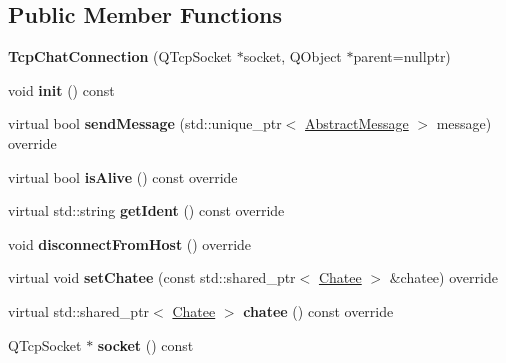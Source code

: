 \subsection*{Public Member Functions}
\begin{DoxyCompactItemize}
\item 
\hypertarget{classSimpleChat_1_1TcpChatConnection_a98eeb678c3851ecd89d9eaa42f2d4ed7}{{\bfseries Tcp\-Chat\-Connection} (Q\-Tcp\-Socket $\ast$socket, Q\-Object $\ast$parent=nullptr)}\label{classSimpleChat_1_1TcpChatConnection_a98eeb678c3851ecd89d9eaa42f2d4ed7}

\item 
\hypertarget{classSimpleChat_1_1TcpChatConnection_a4b67e948f1f6dbb1fedfc5c8f4995fac}{void {\bfseries init} () const }\label{classSimpleChat_1_1TcpChatConnection_a4b67e948f1f6dbb1fedfc5c8f4995fac}

\item 
\hypertarget{classSimpleChat_1_1TcpChatConnection_a70cf88d84909c6f541b5cafd23537f9b}{virtual bool {\bfseries send\-Message} (std\-::unique\-\_\-ptr$<$ \hyperlink{classSimpleChat_1_1AbstractMessage}{Abstract\-Message} $>$ message) override}\label{classSimpleChat_1_1TcpChatConnection_a70cf88d84909c6f541b5cafd23537f9b}

\item 
\hypertarget{classSimpleChat_1_1TcpChatConnection_a2765620a13f5fb7df8001829b01f1eb4}{virtual bool {\bfseries is\-Alive} () const override}\label{classSimpleChat_1_1TcpChatConnection_a2765620a13f5fb7df8001829b01f1eb4}

\item 
\hypertarget{classSimpleChat_1_1TcpChatConnection_a39c8ffddd847c0cf0942349e88143ff1}{virtual std\-::string {\bfseries get\-Ident} () const override}\label{classSimpleChat_1_1TcpChatConnection_a39c8ffddd847c0cf0942349e88143ff1}

\item 
\hypertarget{classSimpleChat_1_1TcpChatConnection_adfa72a80825262c93545627615dc62fd}{void {\bfseries disconnect\-From\-Host} () override}\label{classSimpleChat_1_1TcpChatConnection_adfa72a80825262c93545627615dc62fd}

\item 
\hypertarget{classSimpleChat_1_1TcpChatConnection_ab39fff987021e4d35f5ca3646e77f000}{virtual void {\bfseries set\-Chatee} (const std\-::shared\-\_\-ptr$<$ \hyperlink{classSimpleChat_1_1Chatee}{Chatee} $>$ \&chatee) override}\label{classSimpleChat_1_1TcpChatConnection_ab39fff987021e4d35f5ca3646e77f000}

\item 
\hypertarget{classSimpleChat_1_1TcpChatConnection_ae649c6797a93204f9383224b4c3d3160}{virtual std\-::shared\-\_\-ptr$<$ \hyperlink{classSimpleChat_1_1Chatee}{Chatee} $>$ {\bfseries chatee} () const override}\label{classSimpleChat_1_1TcpChatConnection_ae649c6797a93204f9383224b4c3d3160}

\item 
\hypertarget{classSimpleChat_1_1TcpChatConnection_a56c1b634770ba04677dd243f174c71fa}{Q\-Tcp\-Socket $\ast$ {\bfseries socket} () const }\label{classSimpleChat_1_1TcpChatConnection_a56c1b634770ba04677dd243f174c71fa}

\end{DoxyCompactItemize}
